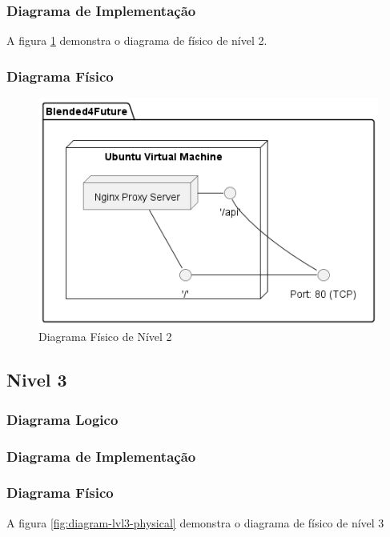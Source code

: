 \subsubsection{Diagrama de Implementação}

A figura \ref{fig:diagram-lvl2-physical} demonstra o diagrama de físico de nível 2.

\subsubsection{Diagrama Físico} 
\begin{figure}[h!tbp]
    \centering
    \includegraphics[width=0.6\linewidth]{capitulos/cap3-analisedoproblema/assets/arquiteturasistema/physical/physical_l2.png}
    \caption{Diagrama Físico de Nível 2}
    \label{fig:diagram-lvl2-physical}
\end{figure}


\subsection{Nivel 3}

\subsubsection{Diagrama Logico}

\subsubsection{Diagrama de Implementação}

\subsubsection{Diagrama Físico} 
A figura \ref{fig:diagram-lvl3-physical} demonstra o diagrama de físico de nível 3 

